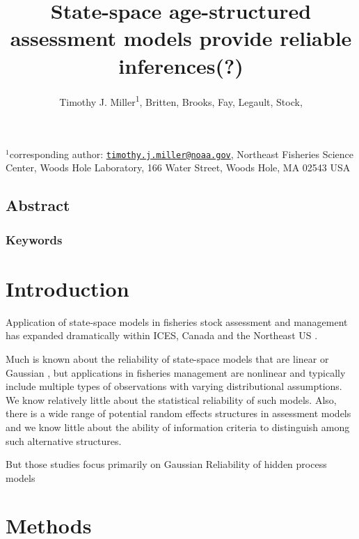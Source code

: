 \documentclass[
  12pt,
]{article}
\title{State-space age-structured assessment models provide reliable
inferences(?)}
\author{Timothy J. Miller\textsuperscript{1}, Britten, Brooks, Fay,
Legault, Stock,}
\date{}
\begin{document}
\maketitle

\(^1\)corresponding author:
\href{mailto:timothy.j.miller@noaa.gov}{\nolinkurl{timothy.j.miller@noaa.gov}},
Northeast Fisheries Science Center, Woods Hole Laboratory, 166 Water
Street, Woods Hole, MA 02543 USA\\

\pagebreak

\hypertarget{abstract}{%
\subsection*{Abstract}\label{abstract}}

\hypertarget{keywords}{%
\subsubsection*{Keywords}\label{keywords}}

\pagebreak

\hypertarget{introduction}{%
\section{Introduction}\label{introduction}}

Application of state-space models in fisheries stock assessment and
management has expanded dramatically within ICES, Canada and the
Northeast US \citep{nielsenberg14,cadigan16,stockmiller21}.

Much is known about the reliability of state-space models that are
linear or Gaussian \citep{aeberhardetal18}, but applications in
fisheries management are nonlinear and typically include multiple types
of observations with varying distributional assumptions. We know
relatively little about the statistical reliability of such models.
Also, there is a wide range of potential random effects structures in
assessment models and we know little about the ability of information
criteria to distinguish among such alternative structures.

But those studies focus primarily on Gaussian Reliability of hidden
process models

\hypertarget{methods}{%
\section{Methods}\label{methods}}
\end{document}
